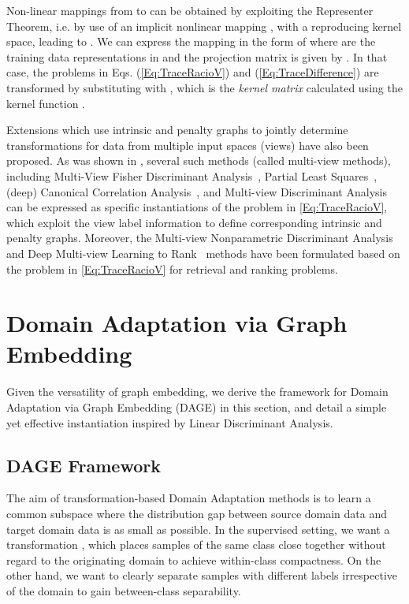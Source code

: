 \documentclass[journal]{IEEEtran}
\begin{document}
Non-linear mappings from  to  can be obtained by exploiting the Representer Theorem, i.e. by use of an implicit nonlinear mapping , with  a reproducing kernel space, leading to . We can express the mapping in the form of  where  are the training data representations in  and the projection matrix is given by . In that case, the problems in Eqs. (\ref{Eq:TraceRacioV}) and (\ref{Eq:TraceDifference}) are transformed by substituting  with , which is the \emph{kernel matrix} calculated using the kernel function .

Extensions which use intrinsic and penalty graphs to jointly determine transformations for data from multiple input spaces (views) have also been proposed. As was shown in \cite{cao2018generalized}, several such methods (called multi-view methods), including
Multi-View Fisher Discriminant Analysis~\cite{diethe2008multiview}, Partial Least Squares~\cite{wold1984collinearity}, (deep) Canonical Correlation Analysis~\cite{andrew2013dcca}, and Multi-view Discriminant Analysis~\cite{kan2016mvda} can be expressed as specific instantiations of the problem in \cref{Eq:TraceRacioV}, which exploit the view label information to define corresponding intrinsic and penalty graphs. Moreover, the Multi-view Nonparametric Discriminant Analysis~\cite{cao2017mvnda} and Deep Multi-view Learning to Rank~\cite{cao2019deepMVLR} methods have been formulated based on the problem in \cref{Eq:TraceRacioV} for retrieval and ranking problems.


\section{Domain Adaptation via Graph Embedding}
\label{sec:dage}
Given the versatility of graph embedding, we derive the framework for Domain Adaptation via Graph Embedding (DAGE) in this section, and detail a simple yet effective instantiation inspired by Linear Discriminant Analysis.


\subsection{DAGE Framework}
The aim of transformation-based Domain Adaptation methods is to learn a common subspace where the distribution gap between source domain data and target domain data is as small as possible. In the supervised setting, we want a transformation , which places samples of the same class close together without regard to the originating domain to achieve within-class compactness. On the other hand, we want  to clearly separate samples with different labels irrespective of the domain to gain between-class separability.
\end{document}
